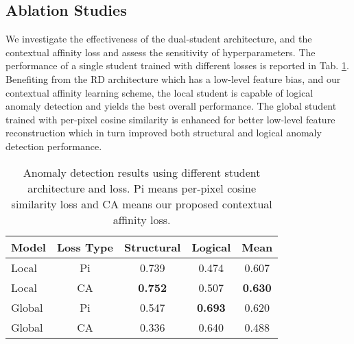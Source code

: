 \documentclass[10pt,twocolumn,letterpaper]{article}
\begin{document}
\subsection{Ablation Studies}





We investigate the effectiveness of the dual-student architecture, and the contextual affinity loss and assess the sensitivity of hyperparameters. The performance of a single student trained with different losses is reported in Tab. \ref{single_student}. Benefiting from the RD \cite{deng2022anomaly} architecture which has a low-level feature bias, and our contextual affinity learning scheme, the local student is capable of logical anomaly detection and yields the best overall performance. The global student trained with per-pixel cosine similarity is enhanced for better low-level feature reconstruction which in turn improved both structural and logical anomaly detection performance.
\begin{table}[t]
\caption{Anomaly detection results using different student architecture and loss. Pi means per-pixel cosine similarity loss and CA means our proposed contextual affinity loss.}
\label{single_student}
\centering
\begin{tabular}{lcccc}
\hline
Model  & Loss Type & Structural & Logical & Mean           \\ \hline
Local  & Pi        & 0.739              & 0.474           & 0.607          \\
Local  & CA        & \textbf{0.752}     & 0.507           & \textbf{0.630} \\
Global & Pi        & 0.547              & \textbf{0.693}  & 0.620          \\
Global & CA        & 0.336              & 0.640           & 0.488          \\ \hline
\end{tabular}

\end{table}
\end{document}
